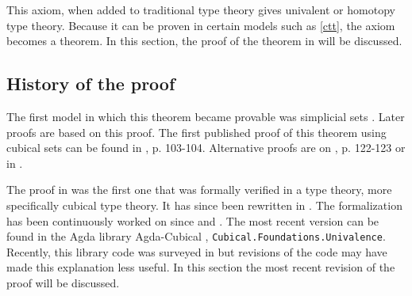 \documentclass[12pt,a4paper,twoside,xetex,draft]{book}
\newcommand{\type}{\mathcal{U}}
\begin{document}
This axiom, when added to traditional type theory gives univalent or homotopy type theory. Because it can be proven in certain models such as \cref{ctt}, the axiom becomes a theorem. In this section, the proof of the theorem in \cite{Moertberg2018} will be discussed.

\subsection{History of the proof}


The first model in which this theorem became provable was simplicial sets \cite{Kapulkin2012}. Later proofs are based on this proof. The first published proof of this theorem using cubical sets can be found in \cite{Huber2016}, p. 103-104. Alternative proofs are on \cite{Huber2016}, p. 122-123 or in \cite{Bezem2018}. 

The proof in \cite{Huber2016} was the first one that was formally verified in a type theory, more specifically cubical type theory. It has since been rewritten in \cite{Weinberger2016}. The formalization has been continuously worked on since \cite{Moertberg2015} and \cite{Cohen2016}. The most recent version can be found in the Agda library Agda-Cubical  \cite{Moertberg2018}, \texttt{Cubical.Foundations.Univalence}. Recently, this library code was surveyed in \cite{Moertberg2018a} but revisions of the code may have made this explanation less useful. In this section the most recent revision of the proof will be discussed.


% 
\end{document}
